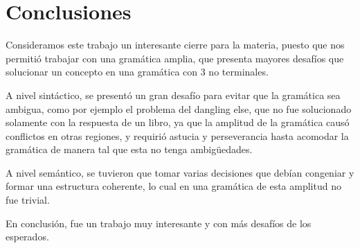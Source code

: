 \section{Conclusiones}

Consideramos este trabajo un interesante cierre para la materia, puesto que nos permitió trabajar con una gramática amplia, que presenta mayores desafíos que solucionar un concepto en una gramática con 3 no terminales.

A nivel sintáctico, se presentó un gran desafío para evitar que la gramática sea ambigua, como por ejemplo el problema del dangling else, que no fue solucionado solamente con la respuesta de un libro, ya que la amplitud de la gramática causó conflictos en otras regiones, y requirió astucia y perseverancia hasta acomodar la gramática de manera tal que esta no tenga ambigüedades.

A nivel semántico, se tuvieron que tomar varias decisiones que debían congeniar y formar una estructura coherente, lo cual en una gramática de esta amplitud no fue trivial.

En conclusión, fue un trabajo muy interesante y con más desafíos de los esperados.